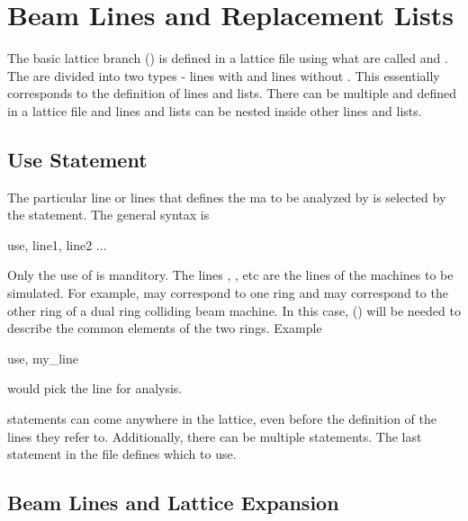 \chapter{Beam Lines and Replacement Lists}
\label{c:sequence}

The basic lattice branch () is defined in a lattice
file using what are called  and .
The  are divided into two types - lines with and lines without
. This essentially corresponds to the \mad
definition of lines and lists. There can be multiple 
and  defined in a lattice file and lines and
lists can be nested inside other lines and lists.

\section{Use Statement}
\label{s:use}

The particular line or lines that defines the ma to be analyzed by \bmad
is selected by the  statement. The general syntax is
\begin{example}
  use, line1, line2 ...
\end{example}
Only the use of  is manditory. The lines ,
, etc are the lines of the machines to be simulated. For
example,  may correspond to one ring and  may
correspond to the other ring of a dual ring colliding beam machine. In
this case,  () will be needed to
describe the common elements of the two rings. Example
\begin{example}
  use, my_line
\end{example}
would pick the line  for analysis. 

 statements can come anywhere in the lattice, even before the
definition of the lines they refer to. Additionally, there can be
multiple  statements.  The last  statement in the file
defines which  to use.

\section{Beam Lines and Lattice Expansion}
\label{s:lines.wo.arg}

